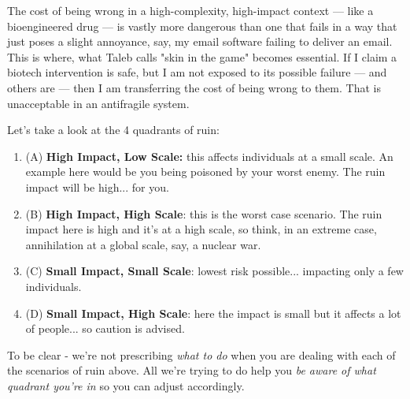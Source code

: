 The cost of being wrong in a high-complexity, high-impact context — like a bioengineered drug — is vastly more dangerous than one that fails in a way that just poses a slight annoyance, say, my email software failing to deliver an email. This is where, what Taleb calls "skin in the game" becomes essential. If I claim a biotech intervention is safe, but I am not exposed to its possible failure — and others are — then I am transferring the cost of being wrong to them. That is unacceptable in an antifragile system.

Let's take a look at the 4 quadrants of ruin:

\begin{center}
\end{center}

\begin{enumerate}
	\item (A) \textbf{High Impact, Low Scale:} this affects individuals at a small scale. An example here would be you being poisoned by your worst enemy. The ruin impact will be high... for you.
	\item (B) \textbf{High Impact, High Scale}: this is the worst case scenario. The ruin impact here is high and it's at a high scale, so think, in an extreme case, annihilation at a global scale, say, a nuclear war.
	\item (C) \textbf{Small Impact, Small Scale}: lowest risk possible... impacting only a few individuals.
	\item (D) \textbf{Small Impact, High Scale}: here the impact is small but it affects a lot of people... so caution is advised.
\end{enumerate}

To be clear - we're not prescribing \emph{what to do} when you are dealing with each of the scenarios of ruin above. All we're trying to do help you \emph{be aware of what quadrant you're in} so you can adjust accordingly.

